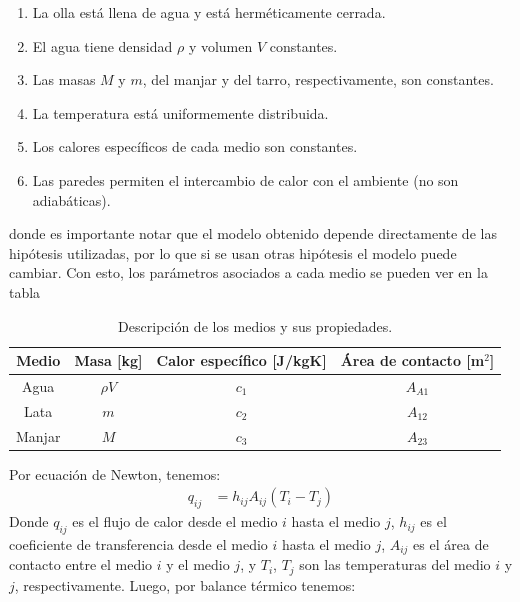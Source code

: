 \documentclass[
  11pt,
  letterpaper,
   addpoints,
   answers
  ]{exam}
\begin{document}
\begin{questions}
\begin{solution}
\begin{enumerate}
    \item La olla está llena de agua y está herméticamente cerrada.
    \item El agua tiene densidad $\rho$ y volumen $V$ constantes.
    \item Las masas $M$ y $m$, del manjar y del tarro, respectivamente, son constantes.
    \item La temperatura está uniformemente distribuida.
    \item Los calores específicos de cada medio son constantes.
    \item Las paredes permiten el intercambio de calor con el ambiente (no son adiabáticas).
\end{enumerate}

donde es importante notar que el modelo obtenido depende directamente de las hipótesis utilizadas, por lo que si se usan otras hipótesis el modelo puede cambiar. Con esto, los parámetros asociados a cada medio se pueden ver en la tabla
\begin{table}[h!]
    \centering
    \begin{tabular}{|c|c|c|c|}
    \hline
    \textbf{Medio} & \textbf{Masa [kg]} & \textbf{Calor específico [J/kgK]} & \textbf{Área de contacto [m$^2$]} \\ \hline
    Agua          & $\rho V$           & $c_1$                            & $A_{A1}$                          \\ \hline
    Lata          & $m$                & $c_2$                            & $A_{12}$                          \\ \hline
    Manjar        & $M$                & $c_3$                            & $A_{23}$                          \\ \hline
    \end{tabular}
    \caption{Descripción de los medios y sus propiedades.}
    \end{table}
Por ecuación de Newton, tenemos:
\begin{align}
    q_{ij} &= h_{ij}A_{ij} (T_i - T_j)
    \end{align}    
Donde $q_{ij}$ es el flujo de calor desde el medio $i$ hasta el medio $j$, $h_{ij}$ es el coeficiente de transferencia desde el medio $i$ hasta el medio $j$, $A_{ij}$ es el área de contacto entre el medio $i$ y el medio $j$, y $T_i$, $T_j$ son las temperaturas del medio $i$ y $j$, respectivamente.
Luego, por balance térmico tenemos:
\begin{align}

\end{align}
\end{solution}
\end{questions}
\end{document}

